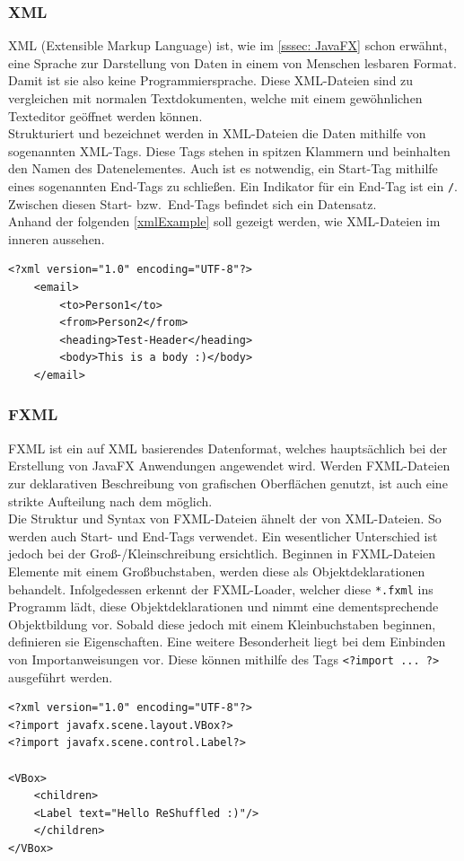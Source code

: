 \subsubsection{XML}
XML (Extensible Markup Language) ist, wie im \autoref{sssec: JavaFX} schon erwähnt, eine Sprache zur Darstellung von Daten in einem von Menschen lesbaren Format.
Damit ist sie also keine Programmiersprache.
Diese XML-Dateien sind zu vergleichen mit normalen Textdokumenten, welche mit einem gewöhnlichen Texteditor geöffnet werden können.\\
Strukturiert und bezeichnet werden in XML-Dateien die Daten mithilfe von sogenannten XML-Tags.
Diese Tags stehen in spitzen Klammern und beinhalten den Namen des Datenelementes.
Auch ist es notwendig, ein Start-Tag mithilfe eines sogenannten End-Tags zu schließen.
Ein Indikator für ein End-Tag ist ein \lstinline{/}.
Zwischen diesen Start- bzw.\ End-Tags befindet sich ein Datensatz.\\
Anhand der folgenden \autoref{xmlExample} soll gezeigt werden, wie XML-Dateien im inneren aussehen.
\begin{lstlisting}[style=XML,caption=XML-Codebeispiel,label=xmlExample]
<?xml version="1.0" encoding="UTF-8"?>
    <email>
        <to>Person1</to>
        <from>Person2</from>
        <heading>Test-Header</heading>
        <body>This is a body :)</body>
    </email>
\end{lstlisting}
\subsubsection{FXML}
FXML ist ein auf XML basierendes Datenformat, welches hauptsächlich bei der Erstellung von JavaFX Anwendungen angewendet wird.
Werden FXML-Dateien zur deklarativen Beschreibung von grafischen Oberflächen genutzt, ist auch eine strikte Aufteilung nach dem  möglich.\\
Die Struktur und Syntax von FXML-Dateien ähnelt der von XML-Dateien.
So werden auch Start- und End-Tags verwendet.
Ein wesentlicher Unterschied ist jedoch bei der Groß-/Kleinschreibung ersichtlich.
Beginnen in FXML-Dateien Elemente mit einem Großbuchstaben, werden diese als Objektdeklarationen behandelt.
Infolgedessen erkennt der FXML-Loader, welcher diese \lstinline{*.fxml} ins Programm lädt, diese Objektdeklarationen und nimmt eine dementsprechende Objektbildung vor.
Sobald diese jedoch mit einem Kleinbuchstaben beginnen, definieren sie Eigenschaften.
Eine weitere Besonderheit liegt bei dem Einbinden von Importanweisungen vor.
Diese können mithilfe des Tags \lstinline{<?import ... ?>} ausgeführt werden.
\begin{lstlisting}[style=XML,caption=FXML-Codebeispiel,label=fxmlExample]
<?xml version="1.0" encoding="UTF-8"?>
<?import javafx.scene.layout.VBox?>
<?import javafx.scene.control.Label?>

<VBox>
    <children>
    <Label text="Hello ReShuffled :)"/>
    </children>
</VBox>
\end{lstlisting}
